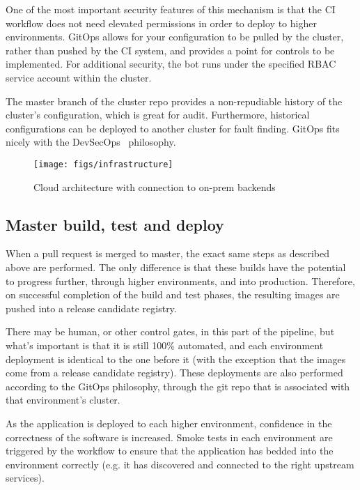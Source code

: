 \documentclass[reprint,amsmath,amssymb,aps]{revtex4-1}
\begin{document}
One of the most important security features of this mechanism is that the CI workflow does not need elevated permissions in order to deploy to higher environments. GitOps allows for your configuration to be pulled by the cluster, rather than pushed by the CI system, and provides a point for controls to be implemented. For additional security, the bot runs under the specified RBAC service account within the cluster.

The master branch of the cluster repo provides a non-repudiable history of the cluster's configuration, which is great for audit. Furthermore, historical configurations can be deployed to another cluster for fault finding. GitOps fits nicely with the DevSecOps~\cite{devsecop73:online} philosophy.

\begin{figure*}[t!]
	\texttt{[image: figs/infrastructure]}
	\caption{Cloud architecture with connection to on-prem backends}
	\label{fig:infrastructure}
\end{figure*}

\subsection{\label{sec:masterbuild}Master build, test and deploy}

When a pull request is merged to master, the exact same steps as described above are performed. The only difference is that these builds have the potential to progress further, through higher environments, and into production. Therefore, on successful completion of the build and test phases, the resulting images are pushed into a release candidate registry.

There may be human, or other control gates, in this part of the pipeline, but what's important is that it is still 100\% automated, and each environment deployment is identical to the one before it (with the exception that the images come from a release candidate registry). These deployments are also performed according to the GitOps philosophy, through the git repo that is associated with that environment's cluster.

As the application is deployed to each higher environment, confidence in the correctness of the software is increased. Smoke tests in each environment are triggered by the workflow to ensure that the application has bedded into the environment correctly (e.g. it has discovered and connected to the right upstream services).
\end{document}
